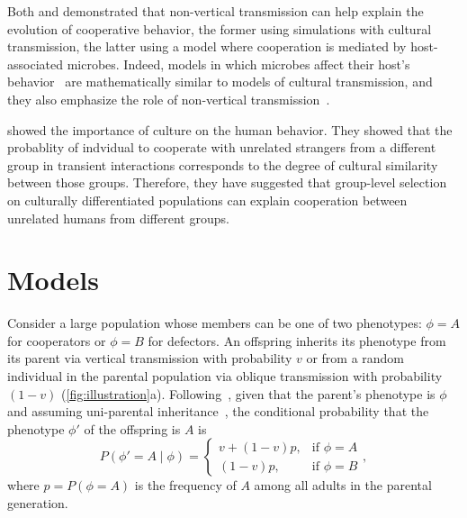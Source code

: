 \documentclass[12pt]{extarticle}
\begin{document}
Both \citet{woodcock2006significance} and \citet{lewin2017microbes} demonstrated that non-vertical transmission can help explain the evolution of cooperative behavior, the former using simulations with cultural transmission, the latter using a model where cooperation is mediated by host-associated microbes.
Indeed, models in which microbes affect their host's behavior~\citep{lewin2017microbes,lewin2020rockpaperscissors,gurevich2020parental} are mathematically similar to models of cultural transmission, and they also emphasize the role of non-vertical transmission~\citep{cavalli1981cultural}.

\citet{handley2020human} showed the importance of culture on the human behavior. They showed that the probablity of indvidual to cooperate with unrelated strangers from a different group in transient interactions corresponds to the degree of cultural similarity between those groups.
Therefore, they have suggested that group-level selection on culturally differentiated populations can explain cooperation between unrelated humans from different groups.

\newpage
\section{Models}

Consider a large population whose members can be one of two phenotypes: $\phi=A$ for cooperators or $\phi=B$ for defectors.
An offspring inherits its phenotype from its parent via vertical transmission with probability $v$ or from a random individual in the parental population via oblique transmission with probability $(1-v)$ (\autoref{fig:illustration}a). 
Following~\citet{ram2018evolution}, given that the parent's phenotype is $\phi$ and assuming uni-parental inheritance~\citep{Zefferman2016}, the conditional probability that the phenotype $\phi'$ of the offspring is $A$ is 
\begin{equation} \label{eq:vertical_oblique_transmission}
P(\phi'=A \mid \phi) = \begin{cases}
v + (1-v)p, & \text{if } \phi=A \\
(1-v)p, & \text{if } \phi=B
\end{cases},
\end{equation}
where $p=P(\phi=A)$ is the frequency of $A$ among all adults in the parental generation.  
\end{document}
